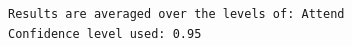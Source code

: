 \documentclass{beamer}\usepackage[]{graphicx}\usepackage[]{xcolor}
\makeatletter
\newenvironment{kframe}{%
 \def\at@end@of@kframe{}%
 \ifinner\ifhmode%
  \def\at@end@of@kframe{\end{minipage}}%
  \begin{minipage}{\columnwidth}%
 \fi\fi%
 \def\FrameCommand##1{\hskip\@totalleftmargin \hskip-\fboxsep
 \colorbox{shadecolor}{##1}\hskip-\fboxsep
     \hskip-\linewidth \hskip-\@totalleftmargin \hskip\columnwidth}%
 \MakeFramed {\advance\hsize-\width
   \@totalleftmargin\z@ \linewidth\hsize
   \@setminipage}}%
 {\par\unskip\endMakeFramed%
 \at@end@of@kframe}
\newenvironment{knitrout}{}{} %
\makeatother
\begin{document}
\begin{frame}[fragile]
\begin{knitrout}
\begin{kframe}
\begin{verbatim}
Results are averaged over the levels of: Attend 
Confidence level used: 0.95 
\end{verbatim}
\end{kframe}
\end{knitrout}


\end{frame}


% 
% 
% 
% 
\end{document}
